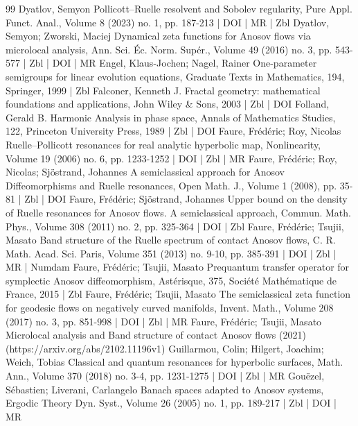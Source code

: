 \documentclass[10pt]{amsart}
\theoremstyle{definition}\newtheorem{defi}[theo]{Definition}\newtheorem{rema}[theo]{Remark}\newtheorem{exam}[theo]{Example}\newtheorem{exem}[theo]{Example}\newtheorem{nota}[theo]{Notation}
\begin{document}
\begin{thebibliography}{99}
Dyatlov, Semyon Pollicott–Ruelle resolvent and Sobolev regularity, Pure Appl. Funct. Anal., Volume 8 (2023) no. 1, pp. 187-213 | DOI | MR | Zbl
Dyatlov, Semyon; Zworski, Maciej Dynamical zeta functions for Anosov flows via microlocal analysis, Ann. Sci. Éc. Norm. Supér., Volume 49 (2016) no. 3, pp. 543-577 | Zbl | DOI | MR
Engel, Klaus-Jochen; Nagel, Rainer One-parameter semigroups for linear evolution equations, Graduate Texts in Mathematics, 194, Springer, 1999 | Zbl
Falconer, Kenneth J. Fractal geometry: mathematical foundations and applications, John Wiley \& Sons, 2003 | Zbl | DOI
Folland, Gerald B. Harmonic Analysis in phase space, Annals of Mathematics Studies, 122, Princeton University Press, 1989 | Zbl | DOI
Faure, Frédéric; Roy, Nicolas Ruelle–Pollicott resonances for real analytic hyperbolic map, Nonlinearity, Volume 19 (2006) no. 6, pp. 1233-1252 | DOI | Zbl | MR
Faure, Frédéric; Roy, Nicolas; Sjöstrand, Johannes A semiclassical approach for Anosov Diffeomorphisms and Ruelle resonances, Open Math. J., Volume 1 (2008), pp. 35-81 | Zbl | DOI
Faure, Frédéric; Sjöstrand, Johannes Upper bound on the density of Ruelle resonances for Anosov flows. A semiclassical approach, Commun. Math. Phys., Volume 308 (2011) no. 2, pp. 325-364 | DOI | Zbl
Faure, Frédéric; Tsujii, Masato Band structure of the Ruelle spectrum of contact Anosov flows, C. R. Math. Acad. Sci. Paris, Volume 351 (2013) no. 9-10, pp. 385-391 | DOI | Zbl | MR | Numdam
Faure, Frédéric; Tsujii, Masato Prequantum transfer operator for symplectic Anosov diffeomorphism, Astérisque, 375, Société Mathématique de France, 2015 | Zbl
Faure, Frédéric; Tsujii, Masato The semiclassical zeta function for geodesic flows on negatively curved manifolds, Invent. Math., Volume 208 (2017) no. 3, pp. 851-998 | DOI | Zbl | MR
Faure, Frédéric; Tsujii, Masato Microlocal analysis and Band structure of contact Anosov flows (2021) (https://arxiv.org/abs/2102.11196v1)
Guillarmou, Colin; Hilgert, Joachim; Weich, Tobias Classical and quantum resonances for hyperbolic surfaces, Math. Ann., Volume 370 (2018) no. 3-4, pp. 1231-1275 | DOI | Zbl | MR
Gouëzel, Sébastien; Liverani, Carlangelo Banach spaces adapted to Anosov systems, Ergodic Theory Dyn. Syst., Volume 26 (2005) no. 1, pp. 189-217 | Zbl | DOI | MR

\end{thebibliography}
\end{document}
